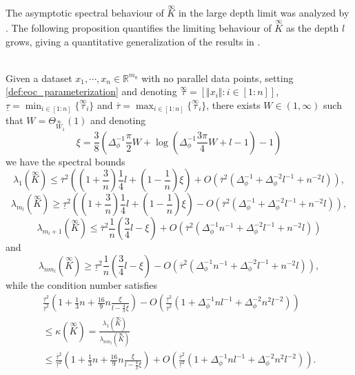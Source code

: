 \documentclass[twoside,11pt]{article}
\newcommand{\R}{\mathbb{R}}
\newcommand{\limiting}[1]{\overset{\scriptscriptstyle\infty}{#1}}
\begin{document}
The asymptotic spectral behaviour of $\limiting{K}$ in the large depth limit was analyzed by \citet{Xiaoetal2020}. The following proposition quantifies the limiting behaviour of $\limiting{K}$ as the depth $l$ grows, giving a quantitative generalization of the results in \citet[Appendix~C.1]{Xiaoetal2020}.

\begin{theorem}[The spectrum of $\limiting{K}$ at the EOC]\label{thm:ntk_spectrum}~\\
Given a dataset $x_1,\cdots,x_n \in \R^{m_0}$ with no parallel data points, setting \eqref{def:eoc_parameterization} and denoting $\limiting{\tau} = [\Vert x_i \Vert : i \in [1:n]]$, $\underline{\tau}=\min_{i\in[1:n]}\{\limiting{\tau}_i\}$ and $\overline{\tau}=\max_{i\in[1:n]}\{\limiting{\tau}_i\}$, there exists $W \in (1,\infty)$ such that $W = \Theta_{\limiting{W}_1}(1)$ and denoting
\[
\xi = \frac{3}{8} \left( \Delta_\phi^{-1} \frac{\pi}{2} W + \log\left( \Delta_\phi^{-1} \frac{3\pi}{4} W + l - 1 \right) - 1 \right)
\]
we have the spectral bounds
\[
\lambda_1\left( \limiting{K} \right) 
\leq \overline{\tau}^2 \left( \left( 1 + \frac{3}{n} \right) \frac{1}{4} l + \left( 1 - \frac{1}{n} \right) \xi \right) + O\left( \overline{\tau}^2 \left( \Delta_\phi^{-1} + \Delta_\phi^{-2} l^{-1} + n^{-2} l \right) \right),
\]
\[
\lambda_{m_l}\left( \limiting{K} \right)
\geq \underline{\tau}^2 \left( \left( 1 + \frac{3}{n} \right) \frac{1}{4} l + \left( 1 - \frac{1}{n} \right) \xi \right) - O\left( \overline{\tau}^2 \left( \Delta_\phi^{-1} + \Delta_\phi^{-2} l^{-1} + n^{-2} l \right) \right),
\]
\[
\lambda_{m_l+1}\left( \limiting{K} \right)
\leq \overline{\tau}^2 \frac{1}{n} \left( \frac{3}{4} l - \xi \right) + O\left( \overline{\tau}^2 \left( \Delta_\phi^{-1} n^{-1} + \Delta_\phi^{-2} l^{-1} + n^{-2} l \right) \right)
\]
and
\[
\lambda_{n m_l}\left( \limiting{K} \right)
\geq \underline{\tau}^2 \frac{1}{n} \left( \frac{3}{4} l - \xi \right) - O\left( \overline{\tau}^2 \left( \Delta_\phi^{-1} n^{-1} + \Delta_\phi^{-2} l^{-1} + n^{-2} l \right) \right),
\]
while the condition number satisfies
\begin{multline*}
\frac{\underline{\tau}^2}{\overline{\tau}^2} \left( 1 + \frac{1}{3} n + \frac{16}{9} n \frac{\xi}{l - \frac{4}{3} \xi} \right) - O\left( \frac{\underline{\tau}^2}{\overline{\tau}^2} \left( 1 + \Delta_\phi^{-1} n l^{-1} + \Delta_\phi^{-2} n^2 l^{-2} \right) \right) \\
\leq \kappa\left( \limiting{K} \right) = \frac{\lambda_1\left( \limiting{K} \right)}{\lambda_{n m_l}\left( \limiting{K} \right)} \\
\leq \frac{\overline{\tau}^2}{\underline{\tau}^2} \left( 1 + \frac{1}{3} n + \frac{16}{9} n \frac{\xi}{l - \frac{4}{3} \xi} \right) + O\left( \frac{\overline{\tau}^2}{\underline{\tau}^2} \left( 1 + \Delta_\phi^{-1} n l^{-1} + \Delta_\phi^{-2} n^2 l^{-2} \right) \right).
\end{multline*}
\end{theorem}
\end{document}
